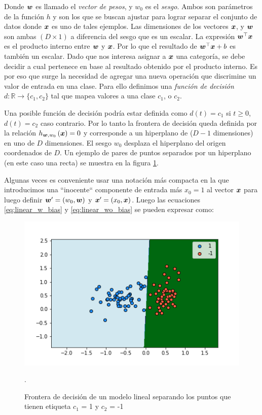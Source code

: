 Donde $\boldsymbol{w}$ es llamado el \emph{vector de pesos}, y $w_0$ es el
\emph{sesgo}. Ambos son parámetros de la función $h$ y son los que se buscan
ajustar para lograr separar el conjunto de datos donde $\boldsymbol{x}$ es uno de
tales ejemplos. Las dimensiones de los vectores $\boldsymbol{x}$, y $\boldsymbol{w}$ son
ambas $(D \times 1)$ a diferencia del sesgo que es un escalar. La expresión
$\boldsymbol{w}^{\top} \boldsymbol{x}$ es el producto interno entre $\boldsymbol{w}$ y $\boldsymbol{x}$.
Por lo que el resultado de $\boldsymbol{w}^{\top} \boldsymbol{x} + b$ es también un escalar.
Dado que nos interesa asignar a $\boldsymbol{x}$ una categoría, se debe decidir a cual
pertenece en base al resultado obtenido por el producto interno. Es por eso que
surge la necesidad de agregar una nueva operación que discrimine un valor de
entrada en una clase. Para ello definimos una \emph{función de decisión} $d:
\mathbb{R} \rightarrow \{c_1, c_2\}$ tal que mapea valores a una clase $c_1$, o
$c_2$.

Una posible función de decisión podría estar definida como $d(t) = c_1$ si $t
\geq 0$, $d(t) = c_2$ caso contrario. Por lo tanto la frontera de decisión queda
definida por la relación $h_{\boldsymbol{w}, w_0}\left( \boldsymbol{x} \right) = 0$ y
corresponde a un hiperplano de ($D-1$ dimensiones) en uno de $D$ dimensiones. El
sesgo $w_0$ desplaza el hiperplano del origen coordenados de $D$. Un ejemplo de
pares de puntos separados por un hiperplano (en este caso una recta) se muestra
en la figura \ref{fig:linear_model_boundary}.

Algunas veces es conveniente usar una notación más compacta en la que
introducimos una ``inocente`` componente de entrada más $x_0 = 1$ al vector
$\boldsymbol{x}$ para luego definir $\boldsymbol{w}' = (w_0, \boldsymbol{w})$ y $\boldsymbol{x}' = (x_0,
\boldsymbol{x})$. Luego las ecuaciones \ref{eq:linear_w_bias} y
\ref{eq:linear_wo_bias} se pueden expresar como:

\begin{figure}
    \centering
    \includegraphics[scale=0.5]{figures/decision_boundary.png}
    \caption{Frontera de decisión de un modelo lineal separando los puntos que
    tienen etiqueta $c_1$ = 1 y $c_2$ = -1}.
    \label{fig:linear_model_boundary}
\end{figure}

